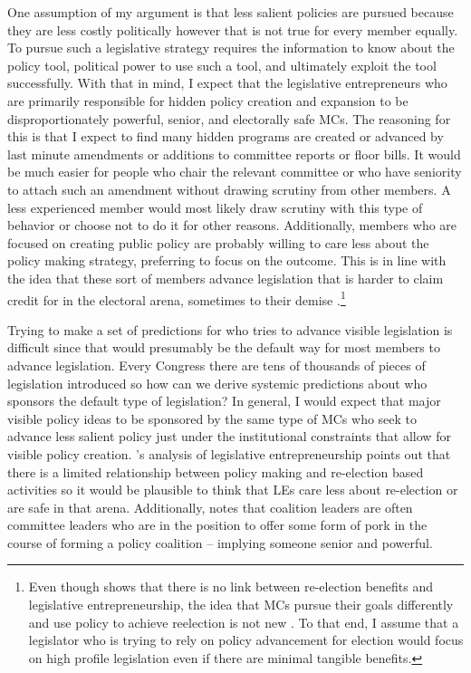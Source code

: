 \documentclass[12pt]{article}
\begin{document}
One assumption of my argument is that less salient policies are pursued because they are less costly politically however that is not true for every member equally. To pursue such a legislative strategy requires the information to know about the policy tool, political power to use such a tool, and ultimately exploit the tool successfully. With that in mind, I expect that the legislative entrepreneurs who are primarily responsible for hidden policy creation and expansion to be disproportionately powerful, senior, and electorally safe MCs. The reasoning for this is that I expect to find many hidden programs are created or advanced by last minute amendments or additions to committee reports or floor bills. It would be much easier for people who chair the relevant committee or who have seniority to attach such an amendment without drawing scrutiny from other members. A less experienced member would most likely draw scrutiny with this type of behavior or choose not to do it for other reasons. Additionally, members who are focused on creating public policy are probably willing to care less about the  policy making strategy, preferring to focus on the outcome. This is in line with the idea that these sort of members advance legislation that is harder to claim credit for in the electoral arena, sometimes to their demise \citep{hibbing1991, wawro2001}.\footnote{Even though \citet{wawro2001} shows that there is no link between re-election benefits and legislative entrepreneurship, the idea that MCs pursue their goals differently and use policy to achieve reelection is not new \citep{fenno1973, kernell1999}. To that end, I assume that a legislator who is trying to rely on policy advancement for election would focus on high profile legislation even if there are minimal tangible benefits.} 

Trying to make a set of predictions for who tries to advance visible legislation is difficult since that would presumably be the default way for most members to advance legislation. Every Congress there are tens of thousands of pieces of legislation introduced so how can we derive systemic predictions about who sponsors the default type of legislation? In general, I would expect that major visible policy ideas to be sponsored by the same type of MCs who seek to advance less salient policy just under the institutional constraints that allow for visible policy creation. \citet{wawro2001}'s analysis of legislative entrepreneurship points out that there is a limited relationship between policy making and re-election based activities so it would be plausible to think that LEs care less about re-election or are safe in that arena. Additionally, \citet[Ch. 3]{evans2004} notes that coalition leaders are often committee leaders who are in the position to offer some form of pork in the course of forming a policy coalition -- implying someone senior and powerful. 
\end{document}

